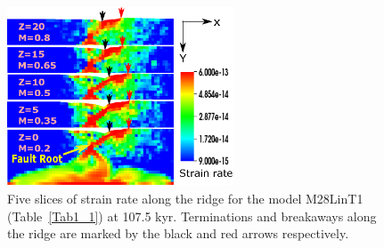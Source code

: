 \begin{figure}[h]
  \centering
    \includegraphics[width=0.6\textwidth]{./Figures/fig_Results1_2.eps}
  \caption{Five slices of strain rate along the ridge for the model M28LinT1 (Table~\hyperref[Tab1_1]{\ref{Tab1_1}}) at 107.5 kyr. Terminations and breakaways along the ridge are marked by the black and red arrows respectively. }
 \label{fig_Results1_2}
\end{figure}   

